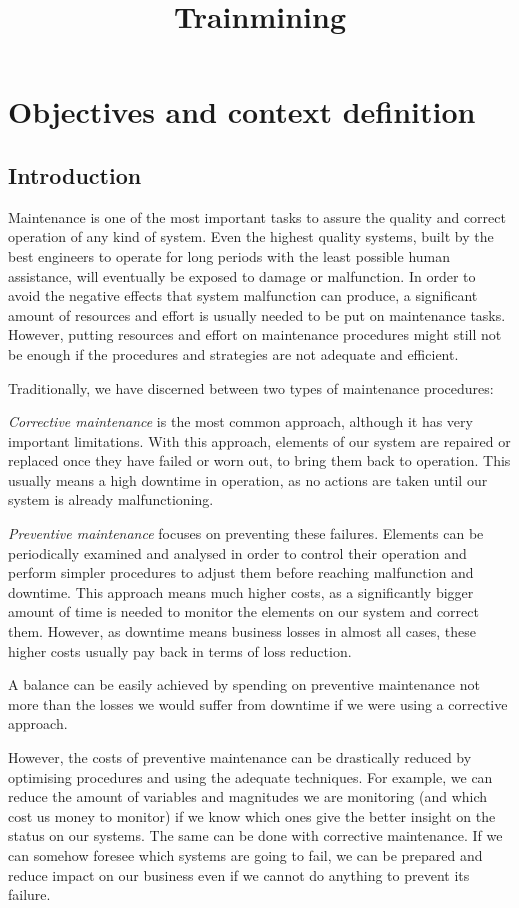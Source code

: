 \documentclass[a4paper,10pt]{report}
\title{Trainmining}
\author{}
\begin{document}
\maketitle


\chapter{Objectives and context definition}
\section{Introduction}\label{sec:context}
Maintenance is one of the most important tasks to assure the quality and correct operation of any kind of system. Even the highest quality systems, built by the best engineers to operate for long periods with the least possible human assistance, will eventually be exposed to damage or malfunction. In order to avoid the negative effects that system malfunction can produce, a significant amount of resources and effort is usually needed to be put on maintenance tasks. However, putting resources and effort on maintenance procedures might still not be enough if the procedures and strategies are not adequate and efficient.

Traditionally, we have discerned between two types of maintenance procedures:

\emph{Corrective maintenance} is the most common approach, although it has very important limitations. With this approach, elements of our system are repaired or replaced once they have failed or worn out, to bring them back to operation. This usually means a high downtime in operation, as no actions are taken until our system is already malfunctioning.

\emph{Preventive maintenance} focuses on preventing these failures. Elements can be periodically examined and analysed in order to control their operation and perform simpler procedures to adjust them before reaching malfunction and downtime. This approach means much higher costs, as a significantly bigger amount of time is needed to monitor the elements on our system and correct them. However, as downtime means business losses in almost all cases, these higher costs usually pay back in terms of loss reduction.

A balance can be easily achieved by spending on preventive maintenance not more than the losses we would suffer from downtime if we were using a corrective approach.

However, the costs of preventive maintenance can be drastically reduced by optimising procedures and using the adequate techniques. For example, we can reduce the amount of variables and magnitudes we are monitoring (and which cost us money to monitor) if we know which ones give the better insight on the status on our systems. The same can be done with corrective maintenance. If we can somehow foresee which systems are going to fail, we can be prepared and reduce impact on our business even if we cannot do anything to prevent its failure.
\end{document}
